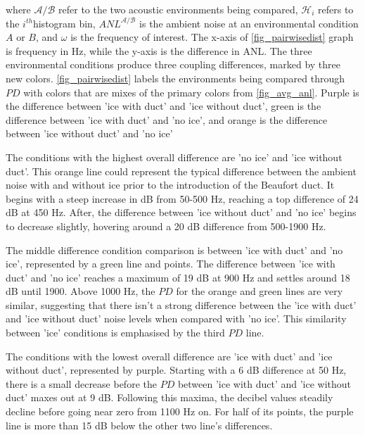 where $\mathcal{A/B}$ refer to the two acoustic environments being compared, $\mathcal{H}_{i}$ refers to the $i^{th}$histogram bin, $ANL^{\mathcal{A/B}}$ is the ambient noise at an environmental condition $A$ or $B$, and $\omega$ is the frequency of interest. The x-axis of \autoref{fig_pairwisedist} graph is frequency in Hz, while the y-axis is the difference in ANL. The three environmental conditions produce three coupling differences, marked by three new colors. \autoref{fig_pairwisedist} labels the environments being compared through $PD$ with colors that are mixes of the primary colors from \autoref{fig_avg_anl}. Purple is the difference between 'ice with duct' and 'ice without duct', green is the difference between 'ice with duct' and 'no ice', and orange is the difference between 'ice without duct' and 'no ice'

The conditions with the highest overall difference are 'no ice' and 'ice without duct'. This orange line could represent the typical difference between the ambient noise with and without ice prior to the introduction of the Beaufort duct. It begins with a steep increase in dB from 50-500 Hz, reaching a top difference of 24 dB at 450 Hz. After, the difference between 'ice without duct' and 'no ice' begins to decrease slightly, hovering around a 20 dB difference from 500-1900 Hz.

The middle difference condition comparison is between 'ice with duct' and 'no ice', represented by a green line and points. The difference between 'ice with duct' and 'no ice' reaches a maximum of 19 dB at 900 Hz and settles around 18 dB until 1900. Above 1000 Hz, the $PD$ for the orange and green lines are very similar, suggesting that there isn't a strong difference between the 'ice with duct' and 'ice without duct' noise levels when compared with 'no ice'. This  similarity between 'ice' conditions is emphasised by the third $PD$ line.

The conditions with the lowest overall difference are 'ice with duct' and 'ice without duct', represented by purple. Starting with a 6 dB difference at 50 Hz, there is a small decrease before the $PD$ between 'ice with duct' and 'ice without duct' maxes out at 9 dB. Following this maxima, the decibel values steadily decline before going near zero from 1100 Hz on. For half of its points, the purple line is more than 15 dB below the other two line's differences.  

